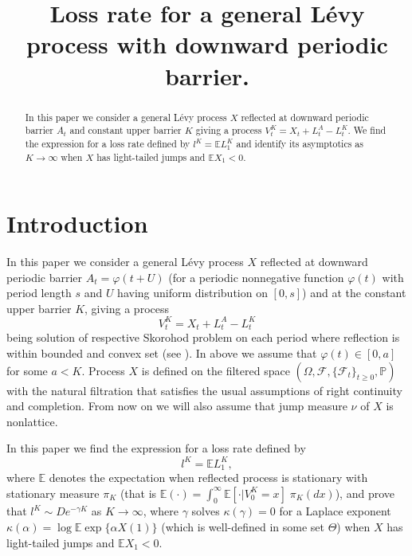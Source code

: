 \documentclass{aptpub}
\begin{document}
\title{Loss rate for a general L\'{e}vy process with downward periodic barrier.} 


\begin{abstract}
In this paper we consider a general L\'{e}vy process $X$ reflected at downward periodic barrier $A_t$ and constant upper barrier $K$
giving a process $V^K_t=X_t+L^A_t-L^K_t$.  We find the expression for a loss rate defined by $l^K=\mathbb{E} L^K_1$
and identify its asymptotics as $K\to\infty$ when $X$ has light-tailed jumps and $\mathbb{E}X_1<0$.

\end{abstract}


         
         

\section{Introduction}
In this paper we consider a general L\'{e}vy process $X$ reflected at downward periodic barrier $A_t=\varphi(t+U)$
(for a periodic nonnegative function $\varphi(t)$ with period length $s$ and $U$ having uniform distribution on $[0,s]$)
and at the constant upper barrier $K$,
giving a process
\begin{equation}\label{jeden}V^K_t=X_t+L^A_t-L^K_t
\end{equation}
being solution of respective Skorohod problem on each period where reflection is within bounded and convex set
(see \cite{Dupuis1, Tanaka}).
In above we assume that $\varphi(t)\in [0,a]$ for some $a<K$. Process $X$ is defined on the filtered space $(\Omega,\mathcal{ F},\{\mathcal{F}_t\}_{t\geq 0}, \mathbb{P})$ with
the natural filtration that satisfies
the usual assumptions of right continuity and completion.
From now on we will also assume that jump measure $\nu$ of $X$ is nonlattice.

In this paper we find the expression for a loss rate defined by
\begin{equation}\label{definitionlossrate}l^K=\mathbb{E} L^K_1,\end{equation}
where $\mathbb{E}$ denotes the expectation when reflected
process is stationary with stationary measure $\pi_K$ (that is $\mathbb{E}(\cdot)=\int_0^\infty \mathbb{E}[\cdot|V_0^K=x]\;\pi_K(dx)$),
 and prove that $l^K\sim De^{-\gamma K}$ as $K\to\infty$, where $\gamma$ solves $\kappa(\gamma)=0$ for a Laplace exponent
$\kappa(\alpha)=\log \mathbb{E} \exp\{\alpha X(1)\}$  (which is well-defined in some set $\Theta$) when $X$ has light-tailed jumps and $\mathbb{E} X_1<0$.
\end{document}
